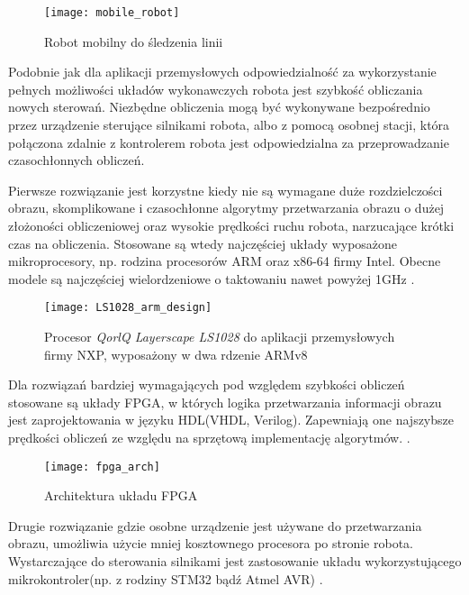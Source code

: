 \documentclass[document.tex]{subfiles}
\begin{document}
	\begin{figure}[h]
	\texttt{[image: mobile\_robot]}
	\caption{Robot mobilny do śledzenia linii\protect\cite{Mazurek_Robot_Viterbi}}
	\label{fig:mobile_robot}
	\end{figure}

\indent Podobnie jak dla aplikacji przemysłowych odpowiedzialność za wykorzystanie
pełnych możliwości układów wykonawczych robota jest szybkość obliczania nowych
sterowań. Niezbędne obliczenia mogą być wykonywane bezpośrednio przez urządzenie
sterujące silnikami robota, albo z pomocą osobnej stacji, która połączona zdalnie
z kontrolerem robota jest odpowiedzialna za przeprowadzanie czasochłonnych obliczeń.

\indent Pierwsze rozwiązanie jest korzystne kiedy nie są wymagane duże rozdzielczości obrazu,
skomplikowane i czasochłonne algorytmy przetwarzania obrazu o dużej złożoności obliczeniowej
oraz wysokie prędkości ruchu robota, narzucające krótki czas na obliczenia. 
Stosowane są wtedy najczęściej układy wyposażone mikroprocesory, np. rodzina procesorów ARM oraz x86-64 firmy Intel. Obecne modele są najczęściej wielordzeniowe o taktowaniu nawet powyżej 1GHz
\cite{NXP_ARM} \cite{Intel_Embedded_Processors}.

	\begin{figure}[h]
	\texttt{[image: LS1028\_arm\_design]}
	\caption{Procesor \textit{QorlQ Layerscape LS1028} do aplikacji przemysłowych firmy NXP, 
	wyposażony w dwa rdzenie ARMv8\protect\cite{NXP_ARM}}
	\label{fig:arm_processor}
	\end{figure}
	
Dla rozwiązań bardziej wymagających pod względem szybkości obliczeń stosowane są układy
FPGA, w których logika przetwarzania informacji obrazu jest zaprojektowania w języku
HDL(VHDL, Verilog). Zapewniają one najszybsze prędkości obliczeń ze względu na 
sprzętową implementację algorytmów. \cite{FPGA_Design}\cite{VHDL_FPGA}. 
	
	\begin{figure}[h]
	\texttt{[image: fpga\_arch]}
	\caption{Architektura układu FPGA\protect\cite{FPGA_Design}}
	\label{fig:fpga}
	\end{figure}	

\indent Drugie rozwiązanie gdzie osobne urządzenie jest używane do przetwarzania obrazu, umożliwia użycie mniej kosztownego procesora po stronie robota. Wystarczające do sterowania silnikami jest zastosowanie układu wykorzystującego mikrokontroler(np. z rodziny STM32 bądź Atmel AVR)\cite{STM32_microcontrollers} \cite{Atmel_microcontrollers}. 
\end{document}
